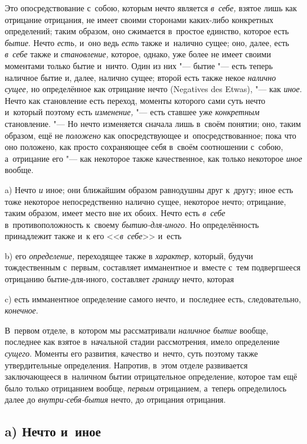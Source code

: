 Это опосредствование с~собою, которым нечто является {\em в~себе,} взятое лишь
как отрицание отрицания, не имеет своими сторонами каких-либо конкретных
определений; таким образом, оно сжимается в~простое единство, которое есть
{\em бытие}. Нечто {\em есть,} и~оно ведь {\em есть} также и~налично сущее;
оно, далее, есть {\em в~себе} также и {\em становление,} которое, однако, уже
более не имеет своими моментами только бытие и~ничто. Один из них "--- бытие
"--- есть теперь наличное бытие и, далее, налично сущее; второй есть также
некое {\em налично сущее,} но определённое как отрицание нечто (Nega\-tives des
Etwas), "--- как {\em иное}. Нечто как становление есть переход, моменты
которого сами суть нечто и~который поэтому есть {\em изменение,} "--- есть
ставшее уже {\em конкретным} становление. "--- Но нечто изменяется сначала лишь
в~своём понятии; оно, таким образом, ещё не {\em положено} как опосредствующее
и~опосредствованное; пока что оно положено, как просто сохраняющее себя в~своём
соотношении с~собою, а~отрицание его "--- как некоторое также качественное, как
только некоторое {\em иное} вообще.


a) Нечто {\em и} иное; они ближайшим образом равнодушны друг к~другу; иное есть
тоже некоторое непосредственно налично сущее, некоторое нечто; отрицание, таким
образом, имеет место вне их обоих. Нечто есть {\em в~себе} в~противоположность
к~своему {\em бытию-для-иного}. Но определённость принадлежит также и~к его
<<{\em в~себе}>> и~есть

b) его {\em определение,} переходящее также в {\em характер,} который, будучи
тождественным с~первым, составляет имманентное и~вместе с~тем подвергшееся
отрицанию бытие-для-иного, составляет {\em границу} нечто, которая

c) есть имманентное определение самого нечто, и~последнее есть,
следовательно, {\em конечное}.

В~первом отделе, в~котором мы рассматривали {\em наличное бытие} вообще,
последнее как взятое в~начальной стадии рассмотрения, имело определение
{\em сущего}. Моменты его развития, качество и~нечто, суть поэтому также
утвердительные определения. Напротив, в~этом отделе развивается заключающееся
в~наличном бытии отрицательное определение, которое там ещё было только
отрицанием вообще, {\em первым} отрицанием, а~теперь определилось далее до
{\em внутри-себя-бытия} нечто, до отрицания отрицания.

\subsection[a) Нечто и~иное]{a) Нечто и~иное}

